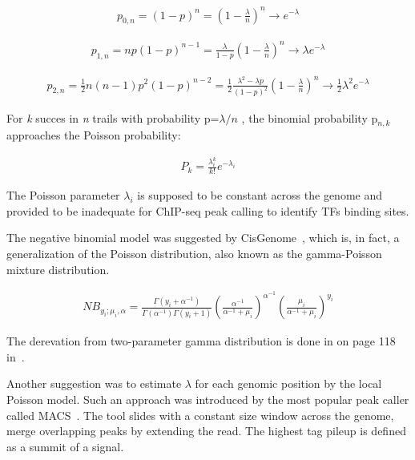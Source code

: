 \begin{align*}
    p_{0,n} = (1 - p)^{n} = \left(1-{\frac{\lambda}{n}}\right)^{n} \to e^{-\lambda}
\end{align*}

\begin{align*}
    p_{1,n} = np(1 - p)^{n-1} = \frac{\lambda}{1-p}\left(1-{\frac{\lambda}{n}}\right)^{n} \to \lambda e^{-\lambda}
\end{align*}

\begin{align*}
    p_{2,n} = \frac{1}{2} n(n - 1) p^{2} (1-p)^{n-2} = \frac{1}{2} \frac{\lambda^{2} - \lambda p}{ (1-p)^{2}} \left(1-{\frac{\lambda}{n}}\right)^{n} \to \frac{1}{2} \lambda^{2} e^{-\lambda}
\end{align*}

For \textit{k} succes in \textit{n} trails with probability p=${\lambda / n}$ , the binomial probability p$_{n,k}$ approaches the Poisson probability:

\begin{align*}
    P_k = \frac{\lambda _i ^{k}}{k!} e^{- \lambda _i}
\end{align*}

The Poisson parameter $\lambda_i$ is supposed to be constant across the genome and provided to be inadequate for ChIP-seq peak calling to identify TFs binding sites. 




The negative binomial model was suggested by CisGenome~\cite{ji2008inte}, which is, in fact, a generalization of the Poisson distribution, also known as the gamma-Poisson mixture distribution. 

\begin{align*}
    NB_{y_i; \mu _i, \alpha} = \frac{\Gamma (y_i + \alpha ^{-1})}{\Gamma(\alpha ^{-1})\Gamma(y_i + 1)} \left(\frac{\alpha ^{-1}}{\alpha ^{-1} + \mu_i}\right) ^{\alpha ^{-1}} \left(\frac{ \mu _i}{ \alpha ^{-1} + \mu _i}\right) ^{y _i}
\end{align*}

The derevation from two-parameter gamma distribution is done in on page 118 in~\cite[Cameron and Trivedi (2013)]{cameron2013regression}.

Another suggestion was to estimate $\lambda$ for each genomic position by the local Poisson model. 
Such an approach was introduced by the most popular peak caller called MACS~\cite{zhang2008model}.
The tool slides with a constant size window across the genome, merge overlapping peaks by extending the read. 
The highest tag pileup is defined as a summit of a signal.  

